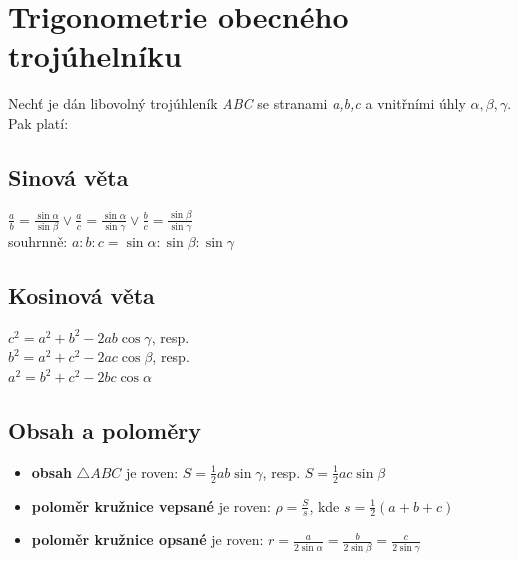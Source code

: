 \documentclass[12pt, a4paper]{article}
\begin{document}
\section{Trigonometrie obecného trojúhelníku}
Nechť je dán libovolný trojúhleník \textit{ABC} se stranami \textit{a,b,c} a vnitřními úhly $\alpha,\beta,\gamma$. Pak platí:
\subsection*{Sinová věta}
\begin{center}
$\frac{a}{b}=\frac{\sin \alpha}{\sin \beta} \lor \frac{a}{c}=\frac{\sin \alpha}{\sin \gamma} \lor \frac{b}{c}=\frac{\sin \beta}{\sin \gamma}$\\
souhrnně: $a:b:c = \sin \alpha : \sin \beta : \sin \gamma$
\end{center}

\subsection*{Kosinová věta}
$c^2=a^2+b^2-2ab\cos \gamma$, resp.\\
$b^2=a^2+c^2-2ac\cos \beta$, resp.\\
$a^2=b^2+c^2-2bc\cos \alpha$

\subsection*{Obsah a poloměry}
\begin{itemize}
\item \textbf{obsah} $\triangle ABC$ je roven: $S = \frac{1}{2}ab\sin \gamma$, resp. $S = \frac{1}{2}ac\sin \beta$
\item \textbf{poloměr kružnice vepsané} je roven: $\rho = \frac{S}{s}$, kde $s=\frac{1}{2}(a+b+c)$
\item \textbf{poloměr kružnice opsané} je roven: $r = \frac{a}{2\sin \alpha}=\frac{b}{2\sin \beta}=\frac{c}{2\sin \gamma}$
\end{itemize}
\end{document}
